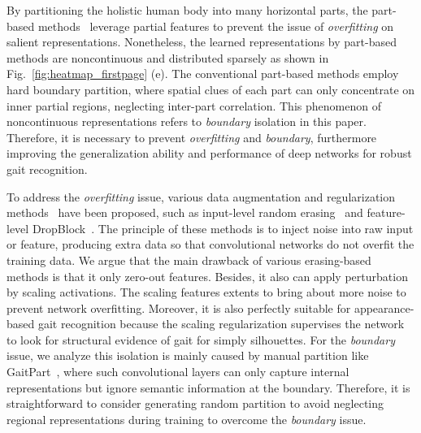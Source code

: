 \documentclass[runningheads]{llncs}
\begin{document}
    By partitioning the holistic human body into many horizontal parts, the part-based methods~\cite{gaitpart,gaitgl,2019_part_zhangyuqi} leverage partial features to prevent the issue of \textit{overfitting} on salient representations.
Nonetheless, the learned representations by part-based methods are noncontinuous and distributed sparsely as shown in Fig.~\ref{fig:heatmap_firstpage} (e). The conventional part-based methods employ hard boundary partition, where spatial clues of each part can only concentrate on inner partial regions, neglecting inter-part correlation. This phenomenon of noncontinuous representations refers to \textit{boundary} isolation in this paper. Therefore, it is necessary to prevent \textit{overfitting} and \textit{boundary}, furthermore improving the generalization ability and performance of deep networks for robust gait recognition.

    To address the \textit{overfitting} issue, various data augmentation and regularization methods~\cite{dropout,batchdropblock} have been proposed, such as input-level random erasing~\cite{RandomErasing} and feature-level DropBlock~\cite{ghiasi2018dropblock}. 
    The principle of these methods is to inject noise into raw input or feature, producing extra data so that convolutional networks do not overfit the training data. We argue that the main drawback of various erasing-based methods is that it only zero-out features. Besides, it also can apply perturbation by scaling activations. The scaling features extents to bring about more noise to prevent network overfitting. Moreover, it is also perfectly suitable for appearance-based gait recognition because the scaling regularization supervises the network to look for structural evidence of gait for simply silhouettes.
For the \textit{boundary} issue, we analyze this isolation is mainly caused by manual partition like GaitPart~\cite{gaitpart}, where such convolutional layers can only capture internal representations but ignore semantic information at the boundary. Therefore, it is straightforward to consider generating random partition to avoid neglecting regional representations during training to overcome the \textit{boundary} issue. 
\end{document}
